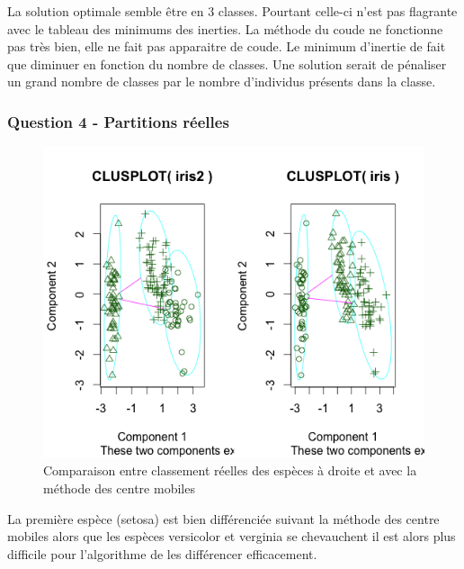 \documentclass{article}\usepackage[]{graphicx}\usepackage[]{color}
\begin{document}
La solution optimale semble être en 3 classes. Pourtant celle-ci n'est pas flagrante avec le tableau des minimums des inerties. La méthode du coude ne fonctionne pas très bien, elle ne fait pas apparaitre de coude. Le minimum d'inertie de  fait que diminuer en fonction du nombre de classes. 
Une solution serait de pénaliser un grand nombre de classes par le nombre d'individus présents dans la classe.

\subsubsection*{Question 4 - Partitions réelles}

\begin{figure}
\includegraphics[width=\textwidth]{ex2_iris_4.png}
\caption{Comparaison entre classement réelles des espèces à droite et avec la méthode des centre mobiles}
\end{figure}

La première espèce (setosa) est bien différenciée suivant la méthode des centre mobiles alors que les espèces versicolor et verginia se chevauchent il est alors plus difficile pour l'algorithme de les différencer efficacement. 
\end{document}
